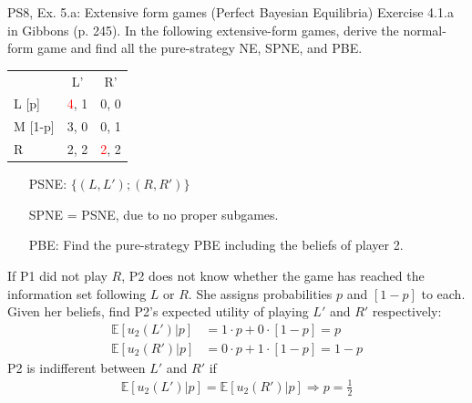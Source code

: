 \begin{frame}{PS8, Ex. 5.a: Extensive form games (Perfect Bayesian Equilibria)}
    Exercise 4.1.a in Gibbons (p. 245). In the following extensive-form games, derive the normal-form game and find all the pure-strategy NE, SPNE, and PBE.
    \vspace{-8pt}
    \begin{multicols}{2}
      \begin{table}
        \begin{tabular}{l|c|c|}
          \multicolumn{1}{c}{} & \multicolumn{1}{c}{L'} & \multicolumn{1}{c}{R'} \\\cline{2-3}
          L [p]   & \textcolor{red}{4}, \color{blue}1 & 0, 0 \\\cline{2-3}
          M [1-p] & 3, 0 & 0, \color{blue}1 \\\cline{2-3}
          R       & 2, \color{blue}2 & \textcolor{red}{2}, \color{blue}2 \\\cline{2-3}
        \end{tabular}
      \end{table} \vspace{-10pt}
      \begin{itemize}
        \item[PSNE:] $\{(L,L');(R,R')\}$
        \item[SPNE =] PSNE, due to no proper subgames.
        \item[PBE:] Find the pure-strategy PBE including the beliefs of player 2.
      \end{itemize} \vspace{-8pt}
      If P1 did not play $R$, P2 does not know whether the game has reached the information set following $L$ or $R$. She assigns probabilities $p$ and $[1-p]$ to each.\\\vspace{2pt}
      Given her beliefs, find P2's expected utility of playing $L'$ and $R'$ respectively: \vspace{-8pt}
      \begin{align*}
        \mathbb{E}[u_2(L')|p]&=1\cdot p+0\cdot[1-p]=p\\
        \mathbb{E}[u_2(R')|p]&=0\cdot p+1\cdot[1-p]=1-p
      \end{align*}
      P2 is indifferent between $L'$ and $R'$ if \vspace{-6pt}
      \begin{align*}
        \mathbb{E}[u_2(L')|p]=\mathbb{E}[u_2(R')|p]\Rightarrow p=\frac{1}{2}
      \end{align*}

\end{multicols}
\end{frame}
